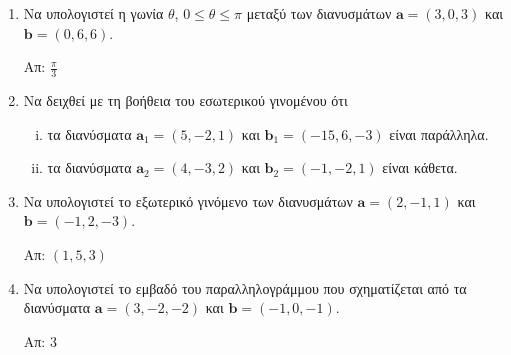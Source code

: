 



\renewcommand{\vec}{\mathbf}
\pagestyle{askhseis}


\begin{center}
  \minibox{\large \bfseries \textcolor{Col1}{Ασκήσεις στα Διανύσματα}}
\end{center}

\vspace{\baselineskip}

\begin{enumerate}
  \item Να υπολογιστεί η γωνία $ \theta $, $ 0\leq \theta \leq \pi $ μεταξύ των διανυσμάτων $
    \vec{a} = (3,0,3) $ και $ \vec{b} = (0,6,6) $.

    \hfill Απ: $ \frac{\pi}{3} $

  \item Να δειχθεί με τη βοήθεια του εσωτερικού γινομένου ότι
    \begin{enumerate}[i)]
      \item τα διανύσματα $ \vec{a}_1 = (5,-2,1) $ και $ \vec{b}_1 = (-15,6,-3) $ είναι παράλληλα.
      \item τα διανύσματα $ \vec{a}_2 = (4,-3,2) $ και $ \vec{b}_2 = (-1,-2,1) $ είναι κάθετα.
    \end{enumerate}

  \item Να υπολογιστεί το εξωτερικό γινόμενο των διανυσμάτων $ \vec{a} = (2,-1,1) $ και $ \vec{b} = (-1,2,-3) $.

    \hfill Απ: $ (1,5,3) $

  \item Να υπολογιστεί το εμβαδό του παραλληλογράμμου που σχηματίζεται από τα διανύσματα $ \vec{a} = (3,-2,-2) $ και $ \vec{b} = (-1,0,-1) $.

    \hfill Απ: $3 $ 
\end{enumerate}


